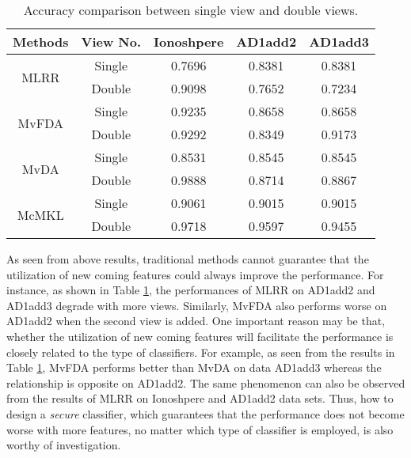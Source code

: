 \documentclass[10pt,journal,compsoc]{IEEEtran}
\begin{document}
\begin{table}[!t]
\caption{Accuracy comparison between single view and double views.}
\label{table_sigle_double_compare}
\centering
\vskip -0.1in
{
\begin{tabular}{c | c || c c c }
\hline
  Methods             &  View No.     & Ionoshpere        & AD1add2          & AD1add3 \\
\hline
\multirow{2}{*}{MLRR} & Single        &  0.7696           &  0.8381          & 0.8381      \\
                      & Double        &  0.9098           &  0.7652          & 0.7234      \\
\hline
\multirow{2}{*}{MvFDA}& Single        &  0.9235           &  0.8658          & 0.8658      \\
                      & Double        &  0.9292           &  0.8349          & 0.9173      \\
\hline
\multirow{2}{*}{MvDA} & Single        &  0.8531           &  0.8545          & 0.8545      \\
                      & Double        &  0.9888           &  0.8714          & 0.8867      \\
\hline
\multirow{2}{*}{McMKL}& Single        &  0.9061           &  0.9015          & 0.9015      \\
                      & Double        &  0.9718           &  0.9597          & 0.9455      \\
\hline
\end{tabular}}
\vskip -0.1in
\end{table}

As seen from above results, traditional methods cannot guarantee that the utilization of new coming features could always improve the performance. For instance, as shown in Table \ref{table_sigle_double_compare}, the performances of MLRR on AD1add2 and AD1add3 degrade with more views. Similarly, MvFDA also performs worse on AD1add2 when the second view is added. One important reason may be that, whether the utilization of new coming features will facilitate the performance is closely related to the type of classifiers. For example, as seen from the results in Table \ref{table_sigle_double_compare}, MvFDA performs better than MvDA on data AD1add3 whereas the relationship is opposite on AD1add2. The same phenomenon can also be observed from the results of MLRR on Ionoshpere and AD1add2 data sets. Thus, how to design a \emph{secure} classifier, which guarantees that the performance does not become worse with more features, no matter which type of classifier is employed, is also worthy of investigation.
\end{document}
